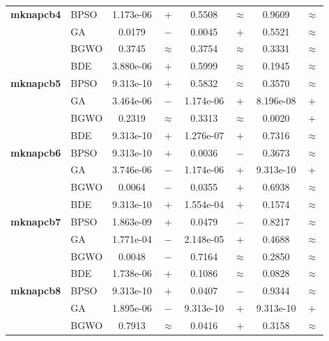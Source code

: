 \begin{table}[htbp]
\begin{tabular*}{\textwidth}{@{\extracolsep{\fill}}llcccccc@{}}
    \midrule
    \textbf{mknapcb4}  & BPSO  & 1.173e-06 & $+$ &    0.5508 & $\approx$ &    0.9609 & $\approx$ \\
                       & GA    &    0.0179 & $-$ &    0.0045 & $+$ &    0.5521 & $\approx$ \\
                       & BGWO  &    0.3745 & $\approx$ &    0.3754 & $\approx$ &    0.3331 & $\approx$ \\
                       & BDE   & 3.880e-06 & $+$ &    0.5999 & $\approx$ &    0.1945 & $\approx$ \\
    \midrule
    \textbf{mknapcb5}  & BPSO  & 9.313e-10 & $+$ &    0.5832 & $\approx$ &    0.3570 & $\approx$ \\
                       & GA    & 3.464e-06 & $-$ & 1.174e-06 & $+$ & 8.196e-08 & $+$ \\
                       & BGWO  &    0.2319 & $\approx$ &    0.3313 & $\approx$ &    0.0020 & $+$ \\
                       & BDE   & 9.313e-10 & $+$ & 1.276e-07 & $+$ &    0.7316 & $\approx$ \\
    \midrule
    \textbf{mknapcb6}  & BPSO  & 9.313e-10 & $+$ &    0.0036 & $-$ &    0.3673 & $\approx$ \\
                       & GA    & 3.746e-06 & $-$ & 1.174e-06 & $+$ & 9.313e-10 & $+$ \\
                       & BGWO  &    0.0064 & $-$ &    0.0355 & $+$ &    0.6938 & $\approx$ \\
                       & BDE   & 9.313e-10 & $+$ & 1.554e-04 & $+$ &    0.1574 & $\approx$ \\
    \midrule
    \textbf{mknapcb7}  & BPSO  & 1.863e-09 & $+$ &    0.0479 & $-$ &    0.8217 & $\approx$ \\
                       & GA    & 1.771e-04 & $-$ & 2.148e-05 & $+$ &    0.4688 & $\approx$ \\
                       & BGWO  &    0.0048 & $-$ &    0.7164 & $\approx$ &    0.2850 & $\approx$ \\
                       & BDE   & 1.738e-06 & $+$ &    0.1086 & $\approx$ &    0.0828 & $\approx$ \\
    \midrule
    \textbf{mknapcb8}  & BPSO  & 9.313e-10 & $+$ &    0.0407 & $-$ &    0.9344 & $\approx$ \\
                       & GA    & 1.895e-06 & $-$ & 9.313e-10 & $+$ & 9.313e-10 & $+$ \\
                       & BGWO  &    0.7913 & $\approx$ &    0.0416 & $+$ &    0.3158 & $\approx$ \\

\end{tabular*}
\end{table}
